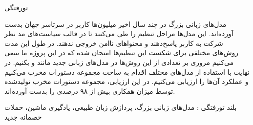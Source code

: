 


‌تورفتگی

مدل‌های زبانی بزرگ در چند سال اخیر میلیون‌ها کاربر در سرتاسر جهان بدست آورده‌اند. این مدل‌ها مراحل تنظیم را طی می‌کنند تا در قالب سیاست‌های مد نظر شرکت به کاربر پاسخ‌دهند و محتواهای ناامن خروجی ندهند. در طول این مدت روش‌های مختلفی برای شکست این تنظیم‌ها امتحان شده که در این پروژه ما سعی می‌کنیم مروری بر تعدادی از این روش‌ها در مدل‌های زبانی جدید مانند  و  بکنیم.
در نهایت با استفاده از مدل‌های مختلف اقدام به ساخت مجموعه دستورات مخرب می‌کنیم و عملکرد آن‌ها را ارزیابی می‌کنیم. در این ارزیابی، مجموعه دستورات مخرب تولید‌شده توسط  میزان همکاری بیش از ۹۸ درصدی را بدست آورده‌اند.

‌بلند
‌تورفتگی : 
مدل‌های زبانی بزرگ، پردازش زبان طبیعی، یادگیری ماشین، حملات خصمانه
‌جدید
